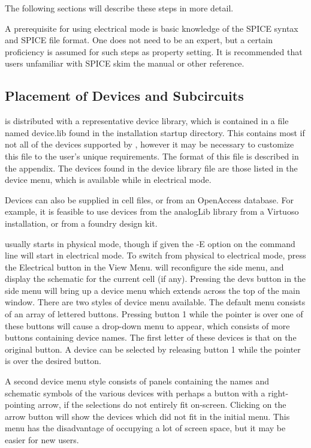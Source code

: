 The following sections will describe these steps in more detail.

A prerequisite for using electrical mode is basic knowledge of the
SPICE syntax and SPICE file format.  One does not need to be an
expert, but a certain proficiency is assumed for such steps as
property setting.  It is recommended that users unfamiliar with SPICE
skim the {\WRspice} manual or other reference.

\subsection{Placement of Devices and Subcircuits}

{\Xic} is distributed with a representative device library, which is
contained in a file named {\vt device.lib} found in the installation
startup directory.  This contains most if not all of the devices
supported by {\WRspice}, however it may be necessary to customize this
file to the user's unique requirements.  The format of this file is
described in the appendix.  The devices found in the device library
file are those listed in the device menu, which is available while in
electrical mode.

Devices can also be supplied in cell files, or from an OpenAccess
database.  For example, it is feasible to use devices from the {\vt
analogLib} library from a Virtuoso installation, or from a foundry
design kit.

{\Xic} usually starts in physical mode, though if given the {\et -E}
option on the command line {\Xic} will start in electrical mode.  To
switch from physical to electrical mode, press the {\cb Electrical}
button in the {\cb View Menu}.  {\Xic} will reconfigure the side menu,
and display the schematic for the current cell (if any).  Pressing the
{\cb devs} button in the side menu will bring up a device menu which
extends across the top of the main {\Xic} window.  There are two
styles of device menu available.  The default menu consists of an
array of lettered buttons.  Pressing button 1 while the pointer is
over one of these buttons will cause a drop-down menu to appear, which
consists of more buttons containing device names.  The first letter of
these devices is that on the original button.  A device can be
selected by releasing button 1 while the pointer is over the desired
button.

A second device menu style consists of panels containing the names and
schematic symbols of the various devices with perhaps a button with a
right-pointing arrow, if the selections do not entirely fit on-screen. 
Clicking on the arrow button will show the devices which did not fit
in the initial menu.  This menu has the disadvantage of occupying a
lot of screen space, but it may be easier for new users.

